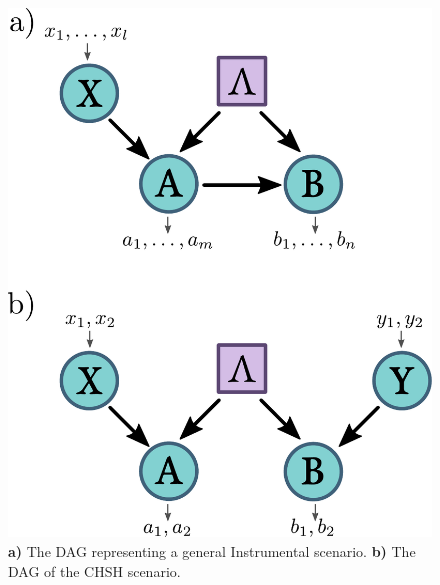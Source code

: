 \documentclass[letterpaper]{article}
\begin{document}


\begin{figure}[h]
    \centering
    \includegraphics[width=.8\columnwidth]{images/chsh_inst_dag.pdf}
        \caption{
    \textbf{a)} The DAG representing a general Instrumental scenario.
    \textbf{b)} The DAG of the CHSH scenario.
}
    \label{fig:chshinstdag}

\end{figure}
\end{document}
